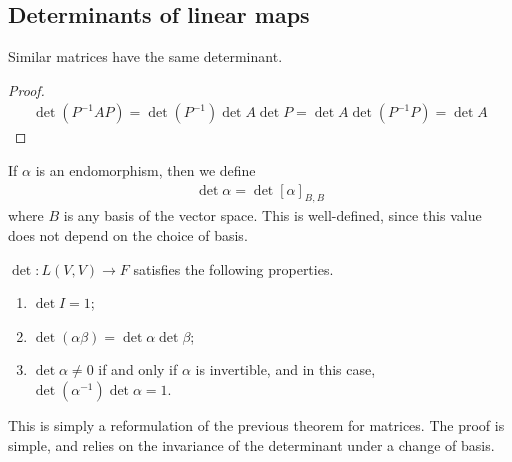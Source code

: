 \subsection{Determinants of linear maps}
\begin{lemma}
	Similar matrices have the same determinant.
\end{lemma}
\begin{proof}
	\begin{align*}
		\det (P^{-1} A P) = \det(P^{-1}) \det A \det P = \det A \det (P^{-1} P) = \det A
	\end{align*}
\end{proof}
\begin{definition}
	If $\alpha$ is an endomorphism, then we define
	\begin{align*}
		\det \alpha = \det [\alpha]_{B, B}
	\end{align*}
	where $B$ is any basis of the vector space.
	This is well-defined, since this value does not depend on the choice of basis.
\end{definition}
\begin{theorem}
	$\det \colon L(V,V) \to F$ satisfies the following properties.
	\begin{enumerate}
		\item $\det I = 1$;
		\item $\det (\alpha\beta) = \det\alpha \det\beta$;
		\item $\det \alpha \neq 0$ if and only if $\alpha$ is invertible, and in this case, $\det(\alpha^{-1}) \det \alpha = 1$.
	\end{enumerate}
	This is simply a reformulation of the previous theorem for matrices.
	The proof is simple, and relies on the invariance of the determinant under a change of basis.
\end{theorem}

